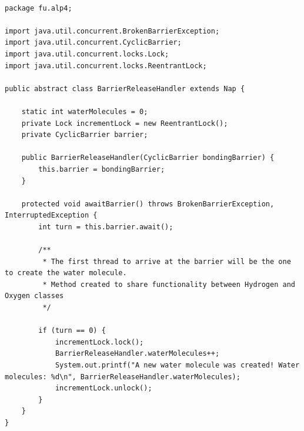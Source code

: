 \begin{lstlisting}[style=java]

package fu.alp4;

import java.util.concurrent.BrokenBarrierException;
import java.util.concurrent.CyclicBarrier;
import java.util.concurrent.locks.Lock;
import java.util.concurrent.locks.ReentrantLock;

public abstract class BarrierReleaseHandler extends Nap {

    static int waterMolecules = 0;
    private Lock incrementLock = new ReentrantLock();
    private CyclicBarrier barrier;

    public BarrierReleaseHandler(CyclicBarrier bondingBarrier) {
        this.barrier = bondingBarrier;
    }

    protected void awaitBarrier() throws BrokenBarrierException, InterruptedException {
        int turn = this.barrier.await();

        /**
         * The first thread to arrive at the barrier will be the one to create the water molecule.
         * Method created to share functionality between Hydrogen and Oxygen classes
         */

        if (turn == 0) {
            incrementLock.lock();
            BarrierReleaseHandler.waterMolecules++;
            System.out.printf("A new water molecule was created! Water molecules: %d\n", BarrierReleaseHandler.waterMolecules);
            incrementLock.unlock();
        }
    }
}

\end{lstlisting}


